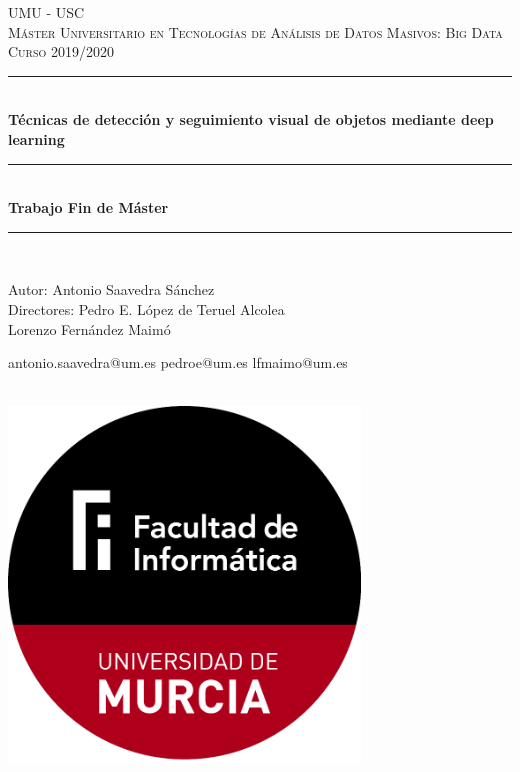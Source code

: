 \begin{titlepage}

    \newcommand{\HRule}{\rule{\linewidth}{0.5mm}} %

    \center %

    \textsc{\LARGE UMU - USC}\\[0.8cm]
    \textsc{\Large Máster Universitario en Tecnologías de Análisis de Datos Masivos: Big Data}\\[0.5cm]
    \textsc{\large Curso 2019/2020}\\[0.4cm]

    \HRule \\[0.6cm]
    { \huge \bfseries Técnicas de detección y seguimiento visual de objetos mediante deep learning}\\[0.3cm]
    \HRule \\[0.5cm]
    { \Large \bfseries Trabajo Fin de Máster}\\[0.3cm]
    \HRule \\[0.2cm]



    \begin{minipage}{0.5\textwidth}
        \begin{flushleft}
            Autor: Antonio Saavedra Sánchez \\
            Directores: Pedro E. López de Teruel Alcolea \\ 
            \setlength\parindent{55pt} Lorenzo Fernández Maimó
        \end{flushleft}
    \end{minipage}
    \begin{minipage}{0.3\textwidth}
        \begin{flushright}
            antonio.saavedra@um.es
            pedroe@um.es
            lfmaimo@um.es
        \end{flushright}
    \end{minipage}\\[1cm]

    \centering
    \includegraphics[width=0.7\textwidth]{./images/logo}


\end{titlepage}

